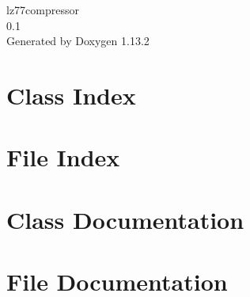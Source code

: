 \documentclass[twoside]{book}
\newcommand{\+}{\discretionary{\mbox{\scriptsize$\hookleftarrow$}}{}{}}
\newcommand{\clearemptydoublepage}{%
    \newpage{\pagestyle{empty}\cleardoublepage}%
  }
\begin{document}
  \raggedbottom
    \hypersetup{pageanchor=false,
                bookmarksnumbered=true,
                pdfencoding=unicode
               }
  \begin{titlepage}
  \vspace*{7cm}
  \begin{center}%
  {\Large lz77compressor}\\
  [1ex]\large 0.\+1 \\
  \vspace*{1cm}
  {\large Generated by Doxygen 1.13.2}\\
  \end{center}
  \end{titlepage}
  \clearemptydoublepage
  \tableofcontents
  \clearemptydoublepage
  \hypersetup{pageanchor=true}
\chapter{Class Index}

\chapter{File Index}

\chapter{Class Documentation}






\chapter{File Documentation}






  \backmatter
  \newpage
  \clearemptydoublepage
  \printindex
\end{document}
